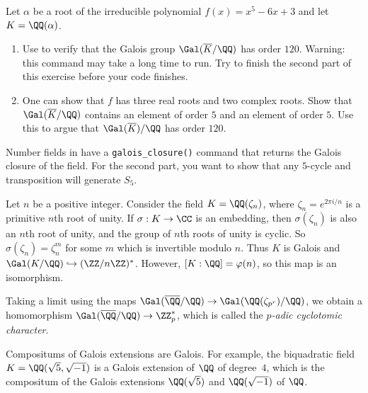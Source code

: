 \begin{exercise}
  Let $\alpha$ be a root of the irreducible polynomial $f(x) = x^5 - 6x + 3$ and
  let $K = \QQ(\alpha)$.
  \begin{enumerate}[label=(\alph*)]
    \item
          Use {\Sage} to verify that the Galois group $\Gal(\overline{K}/\QQ)$
          has order $120$.
          Warning: this command may take a long time to run.
          Try to finish the second part of this exercise before your code
          finishes.

    \item
          One can show that $f$ has three real roots and two complex roots.
          Show that $\Gal(\overline{K}/\QQ)$ contains an element of order $5$ and
          an element of order $5$. Use this to argue that $\Gal(\overline{K})/\QQ$
          has order $120$.
  \end{enumerate}
  \begin{hint}
    Number fields in {\Sage} have a {\tt galois\_closure()} command that
    returns the Galois closure of the field.
    For the second part, you want to show that any $5$-cycle and transposition
    will generate $S_5$.
  \end{hint}
\end{exercise}

\begin{example}
  Let $n$ be a positive integer. Consider the field $K=\QQ(\zeta_n)$,
  where $\zeta_n=e^{2\pi i/n}$ is a primitive $n$th root of unity.  If
  $\sigma:K\to \CC$ is an embedding, then $\sigma(\zeta_n)$ is also an
  $n$th root of unity, and the group of $n$th roots of unity is cyclic.
  So $\sigma(\zeta_n) = \zeta_n^m$ for some $m$ which is invertible
  modulo $n$.  Thus $K$ is Galois and $\Gal(K/\QQ) \hookrightarrow (\ZZ/n\ZZ)^*$.
  However, $[K:\QQ] = \varphi(n)$, so this map is an isomorphism.
\end{example}

\begin{remark}
  Taking a limit using the maps $\Gal(\overline{\QQ}/\QQ)\to
    \Gal(\QQ(\zeta_{p^r})/\QQ)$, we obtain a homomorphism $\Gal(\overline{\QQ}/\QQ)\to
    \ZZ_p^*$, which is called the {\em $p$-adic cyclotomic character}.
\end{remark}

Compositums of Galois extensions are Galois.  For example, the
biquadratic field $K=\QQ(\sqrt{5},\sqrt{-1})$ is a Galois
extension of $\QQ$ of degree~$4$, which is the compositum
of the Galois extensions $\QQ(\sqrt{5})$ and $\QQ(\sqrt{-1})$ of $\QQ$.

